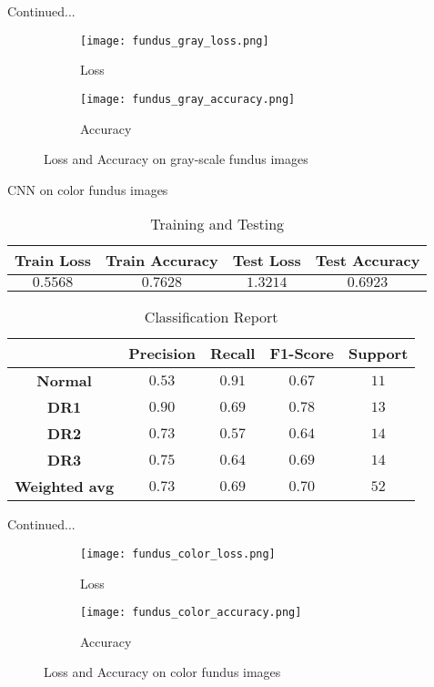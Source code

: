\documentclass{beamer}
\begin{document}
\begin{frame}{Continued...}
\begin{figure}[H]
\centering
\begin{subfigure}[h]{0.45\linewidth}
\texttt{[image: fundus\_gray\_loss.png]}
\caption{Loss}
\label{fig:a}
\end{subfigure}
\quad
\begin{subfigure}[h]{0.45\linewidth}
\texttt{[image: fundus\_gray\_accuracy.png]}
\caption{Accuracy}
\label{fig:b}
\end{subfigure}
\caption{Loss and Accuracy on gray-scale fundus images}
\label{fig: Image1}
\end{figure}    

\end{frame}
\begin{frame}{CNN on color fundus images}
\begin{table}
\caption{Training and Testing}
\begin{tabular}{c c c c}
\hline
\textbf{Train Loss} & \textbf{Train Accuracy} & \textbf{Test Loss} & \textbf{Test Accuracy}\\
\hline
$0.5568$ & $0.7628$ & $1.3214$ & $0.6923$\\
\hline
\end{tabular}
\end{table}

\begin{table}
\caption{Classification Report}
\begin{tabular}{c c c c c}
\hline
\textbf{} & \textbf{Precision} & \textbf{Recall} & \textbf{F1-Score} & \textbf{Support} \\
\hline
\textbf{Normal} & $0.53$ & $0.91$ & $0.67$ & $11$\\
\textbf{DR1} & $0.90$ & $0.69$ & $0.78$ & $13$\\
\textbf{DR2} & $0.73$ & $0.57$ & $0.64$ & $14$\\
\textbf{DR3} & $0.75$ & $0.64$ & $0.69$ & $14$\\
\textbf{Weighted avg} & $0.73$ & $0.69$ & $0.70$ & $52$\\
\hline
\end{tabular}
\end{table}
\end{frame}
\begin{frame}{Continued...}
\begin{figure}[H]
\centering
\begin{subfigure}[h]{0.45\linewidth}
\texttt{[image: fundus\_color\_loss.png]}
\caption{Loss}
\label{fig:a}
\end{subfigure}
\quad
\begin{subfigure}[h]{0.45\linewidth}
\texttt{[image: fundus\_color\_accuracy.png]}
\caption{Accuracy}
\label{fig:b}
\end{subfigure}
\caption{Loss and Accuracy on color fundus images}
\label{fig: Image2}
\end{figure}
\end{frame}
\end{document}
